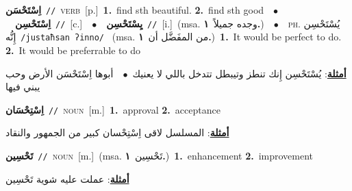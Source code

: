 \documentclass[10pt,a4paper,twoside]{article} %
\begin{document}
\begin{multicols}{2}
{\setlength\topsep{0pt}\textbf{\foreignlanguage{arabic}{اِسْتَحْسَن}}\ {\color{gray}\texttt{//}\color{black}}\ \textsc{verb}\ [p.]\ \textbf{1.}~find sth beautiful.  \textbf{2.}~find sth good\ \ $\bullet$\ \ \setlength\topsep{0pt}\textbf{\foreignlanguage{arabic}{اِسْتَحْسِن}}\ {\color{gray}\texttt{//}\color{black}}\ [c.]\ \ $\bullet$\ \ \setlength\topsep{0pt}\textbf{\foreignlanguage{arabic}{يِسْتَحْسِن}}\ {\color{gray}\texttt{//}\color{black}}\ [i.]\ \color{gray}(msa. \foreignlanguage{arabic}{وجده جميلاً}~\foreignlanguage{arabic}{\textbf{١.}})\color{black}\ \ $\bullet$\ \ \textsc{ph.} \color{gray} \foreignlanguage{arabic}{يُسْتَحْسِن إِنُّه}\color{black}\ {\color{gray}\texttt{/{\sffamily justaħsan ʔinno}/}\color{black}}\ \color{gray} (msa. \foreignlanguage{arabic}{من المفَضَّل أن}~\foreignlanguage{arabic}{\textbf{١.}})\color{black}\ \textbf{1.}~It would be perfect to do.  \textbf{2.}~It would be preferrable to do\  \begin{flushright}\color{gray}\foreignlanguage{arabic}{\textbf{\underline{\foreignlanguage{arabic}{أمثلة}}}: يُسْتَحْسِن إِنك تنطز وتيبطل تتدخل باللي لا يعنيك\ $\bullet$\ \  أبوها اِسْتَحْسَن الأرض وحب يبني فيها}\end{flushright}\color{black}} \vspace{2mm}

{\setlength\topsep{0pt}\textbf{\foreignlanguage{arabic}{اِسْتِحْسَان}}\ {\color{gray}\texttt{//}\color{black}}\ \textsc{noun}\ [m.]\ \textbf{1.}~approval  \textbf{2.}~acceptance\  \begin{flushright}\color{gray}\foreignlanguage{arabic}{\textbf{\underline{\foreignlanguage{arabic}{أمثلة}}}: المسلسل لاقى اِسْتِحْسان كبير من الجمهور والنقاد}\end{flushright}\color{black}} \vspace{2mm}

{\setlength\topsep{0pt}\textbf{\foreignlanguage{arabic}{تَحْسِين}}\ {\color{gray}\texttt{//}\color{black}}\ \textsc{noun}\ [m.]\ \color{gray}(msa. \foreignlanguage{arabic}{تَحْسِين}~\foreignlanguage{arabic}{\textbf{١.}})\color{black}\ \textbf{1.}~enhancement  \textbf{2.}~improvement\  \begin{flushright}\color{gray}\foreignlanguage{arabic}{\textbf{\underline{\foreignlanguage{arabic}{أمثلة}}}: عملت عليه شوية تَحْسِين}\end{flushright}\color{black}} \vspace{2mm}


\end{multicols}
\end{document}
